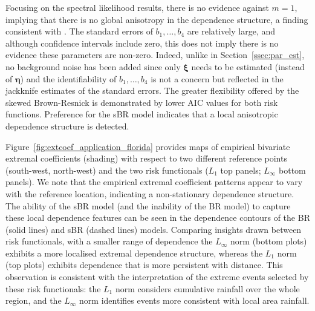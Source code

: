 \documentclass[12pt]{article}
\begin{document}
Focusing on the spectral likelihood results,
there is no evidence against $m=1$, implying that there is no global anisotropy in the dependence structure, a finding consistent with \cite{deFondeville.Davison:2018}. 
%
The standard errors of 
$b_1,\ldots,b_4$ are relatively large, and although confidence intervals include zero, this does not imply there is no evidence these parameters are non-zero. 
Indeed, unlike in Section~\ref{ssec:par_est}, no background noise has been added since only $\bm \xi$ needs to be estimated (instead of $\bm \eta$) and the identifiability of $b_1, \ldots, b_4$ is not a concern but reflected in the jackknife estimates of the standard errors.
%
The greater flexibility offered by the skewed Brown-Resnick is demonstrated by lower AIC values 
for both risk functions.
Preference for the sBR model indicates that a local anisotropic dependence structure is detected.

 


%
Figure~\ref{fig:extcoef_application_florida} provides maps of empirical bivariate extremal coefficients (shading) with respect to two different reference points (south-west, north-west) and the two risk functionals ($L_1$ top panels; $L_\infty$ bottom panels).
We note that the empirical extremal coefficient patterns appear to vary with the reference location, indicating a non-stationary dependence structure.
The ability of the sBR model (and the inability of the BR model) to capture these local dependence features can be seen in the dependence contours of the
BR (solid lines) and sBR (dashed lines) models.
%
%
Comparing insights drawn between risk functionals, with a smaller range of dependence the $L_\infty$ norm (bottom plots) exhibits a more localised extremal dependence structure, whereas the $L_1$ norm (top plots) exhibits dependence that is more persistent with distance. 
%
This observation is consistent with the interpretation of the extreme events selected by these risk functionals:
the $L_1$ norm considers cumulative rainfall over the whole region,
and
the $L_\infty$ norm identifies events more consistent with local area rainfall.
%
%
\end{document}
